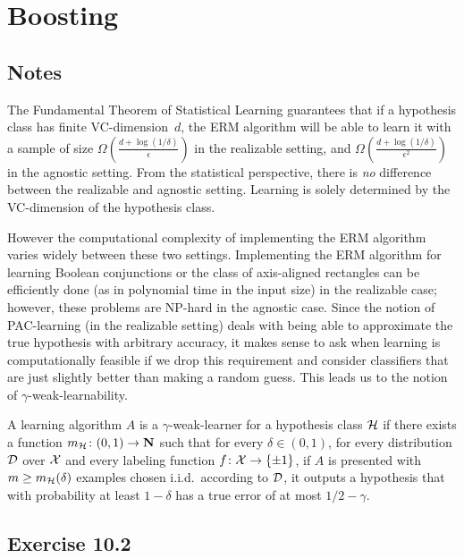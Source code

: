 \chapter{Boosting}

\section{Notes}

The Fundamental Theorem of Statistical Learning guarantees that if a hypothesis
class has finite VC-dimension~$d$, the ERM algorithm will be able to
learn it with a sample of size $\Omega(\frac{d + \log (1 / \delta)}{\epsilon})$
in the realizable setting, and $\Omega(\frac{d + \log (1 /
\delta)}{\epsilon^2})$ in the agnostic setting. From the statistical
perspective, there is \emph{no} difference between the realizable and agnostic
setting. Learning is solely determined by the VC-dimension of the hypothesis
class.

However the computational complexity of implementing the ERM algorithm varies
widely between these two settings. Implementing the ERM algorithm for learning
Boolean conjunctions or the class of axis-aligned rectangles can be efficiently
done (as in polynomial time in the input size) in the realizable case; however,
these problems are NP-hard in the agnostic case. Since the notion of
PAC-learning (in the realizable setting) deals with being able to approximate
the true hypothesis with arbitrary accuracy, it makes sense to ask when
learning is computationally feasible if we drop this requirement and consider
classifiers that are just slightly better than making a random guess.  This
leads us to the notion of $\gamma$-weak-learnability.

\begin{definition}
A learning algorithm $A$ is a $\gamma$-weak-learner for a hypothesis class 
$\mathcal{H}$ if there exists a function $m_{\mathcal{H}} \colon (0, 1) \rightarrow \mathbf{N}$
such that for every $\delta \in (0, 1)$, for every distribution $\mathcal{D}$ over $\mathcal{X}$
and every labeling function $f \colon \mathcal{X} \rightarrow \{\pm 1\}$, if $A$ 
is presented with $m \geq m_{\mathcal{H}} (\delta)$ examples chosen i.i.d.\ 
according to $\mathcal{D}$, it outputs a hypothesis that with probability at least 
$1 - \delta$ has a true error of at most $1/2 - \gamma$. 
\end{definition}

\section*{Exercise 10.2}


